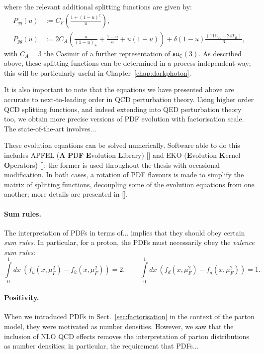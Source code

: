 \documentclass[withindex,glossary]{cam-thesis}
\begin{document}
where the relevant additional splitting functions are given by:
\begin{align}
P_{gq}(u) &:= C_F \left( \frac{1 + (1-u)^2}{u} \right),\\[1.5ex]
P_{gg}(u) &:= 2 C_A \left( \frac{u}{(1-u)_+} + \frac{1-u}{u} + u(1-u) \right) + \delta(1-u) \frac{(11C_A - 24 T_R)}{6},
\end{align}
with $C_A = 3$ the Casimir of a further representation of $\mathfrak{su}_\mathbb{C}(3)$. As described above, these splitting functions can be determined in a process-independent way; this will be particularly useful in Chapter~\ref{chap:darkphoton}.

It is also important to note that the equations we have presented above are accurate to next-to-leading order in QCD perturbation theory. Using higher order QCD splitting functions, and indeed extending into QED perturbation theory too, we obtain more precise versions of PDF evolution with factorisation scale. The state-of-the-art involves...

These evolution equations can be solved numerically. Software able to do this includes APFEL (\textbf{A} \textbf{P}D\textbf{F} \textbf{E}volution \textbf{L}ibrary) [] and EKO (\textbf{E}volution \textbf{K}ernel \textbf{O}perators) []; the former is used throughout the thesis with occasional modification. In both cases, a rotation of PDF flavours is made to simplify the matrix of splitting functions, decoupling some of the evolution equations from one another; more details are presented in [].

\paragraph{Sum rules.} The interpretation of PDFs in terms of... implies that they should obey certain \textit{sum rules}. In particular, for a proton, the PDFs must necessarily obey the \textit{valence sum rules}:
\begin{equation}
\int\limits_{0}^{1} dx\ \left( f_u(x,\mu_F^2) - f_{\bar{u}}(x,\mu_F^2) \right) = 2, \qquad \int\limits_{0}^{1} dx\ \left( f_d(x,\mu_F^2) - f_{\bar{d}}(x,\mu_F^2) \right) = 1.
\end{equation} 

\paragraph{Positivity.} When we introduced PDFs in Sect.~\ref{sec:factorisation} in the context of the parton model, they were motivated as number densities. However, we saw that the inclusion of NLO QCD effects removes the interpretation of parton distributions as number densities; in particular, the requirement that PDFs... 
\end{document}
